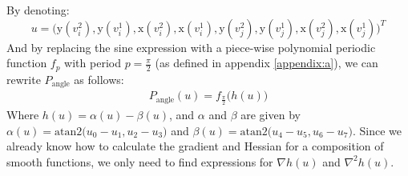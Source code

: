 \noindent By denoting:
\begin{equation}\label{eq:angle_penalty}
u = \Big(\mathrm{y}\left(v_i^2\right), \mathrm{y}\left(v_i^1\right), \mathrm{x}\left(v_i^2\right), \mathrm{x}\left(v_i^1\right), \mathrm{y}\left(v_j^2\right), \mathrm{y}\left(v_j^1\right), \mathrm{x}\left(v_j^2\right), \mathrm{x}\left(v_j^1\right)\Big)^T
\end{equation}
And by replacing the sine expression with a piece-wise polynomial periodic function $f_p$ with period $p=\frac{\pi}{2}$ (as defined in appendix \ref{appendix:a}), we can rewrite $P_{\mathrm{angle}}$ as follows:
\begin{equation}\label{eq:angle_penalty_rephrased}
\begin{split}
P_{\mathrm{angle}}\left(u\right) = f_{\frac{\pi}{2}} \bigg(h\left(u\right)\bigg)
\end{split}
\end{equation}
Where $h\left(u\right) = \alpha\left(u\right) - \beta\left(u\right)$, and $\alpha$ and $\beta$ are given by $\alpha\left(u\right) = \mathrm{atan2}\Big(u_0 - u_1, u_2 - u_3\Big)$ and $\beta\left(u\right) = \mathrm{atan2}\Big(u_4 - u_5, u_6 -u_7\Big)$.
\noindent Since we already know how to calculate the gradient and Hessian for a composition of smooth functions, we only need to find expressions for $\nabla h\left(u\right)$ and $\nabla^2 h\left(u\right)$.
